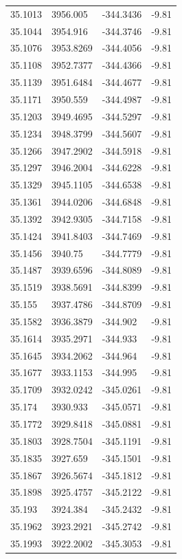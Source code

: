 \begin{table}[H]
\begin{tabular}{llll}
35.1013 & 3956.005 & -344.3436 & -9.81 \\
35.1044 & 3954.916 & -344.3746 & -9.81 \\
35.1076 & 3953.8269 & -344.4056 & -9.81 \\
35.1108 & 3952.7377 & -344.4366 & -9.81 \\
35.1139 & 3951.6484 & -344.4677 & -9.81 \\
35.1171 & 3950.559 & -344.4987 & -9.81 \\
35.1203 & 3949.4695 & -344.5297 & -9.81 \\
35.1234 & 3948.3799 & -344.5607 & -9.81 \\
35.1266 & 3947.2902 & -344.5918 & -9.81 \\
35.1297 & 3946.2004 & -344.6228 & -9.81 \\
35.1329 & 3945.1105 & -344.6538 & -9.81 \\
35.1361 & 3944.0206 & -344.6848 & -9.81 \\
35.1392 & 3942.9305 & -344.7158 & -9.81 \\
35.1424 & 3941.8403 & -344.7469 & -9.81 \\
35.1456 & 3940.75 & -344.7779 & -9.81 \\
35.1487 & 3939.6596 & -344.8089 & -9.81 \\
35.1519 & 3938.5691 & -344.8399 & -9.81 \\
35.155 & 3937.4786 & -344.8709 & -9.81 \\
35.1582 & 3936.3879 & -344.902 & -9.81 \\
35.1614 & 3935.2971 & -344.933 & -9.81 \\
35.1645 & 3934.2062 & -344.964 & -9.81 \\
35.1677 & 3933.1153 & -344.995 & -9.81 \\
35.1709 & 3932.0242 & -345.0261 & -9.81 \\
35.174 & 3930.933 & -345.0571 & -9.81 \\
35.1772 & 3929.8418 & -345.0881 & -9.81 \\
35.1803 & 3928.7504 & -345.1191 & -9.81 \\
35.1835 & 3927.659 & -345.1501 & -9.81 \\
35.1867 & 3926.5674 & -345.1812 & -9.81 \\
35.1898 & 3925.4757 & -345.2122 & -9.81 \\
35.193 & 3924.384 & -345.2432 & -9.81 \\
35.1962 & 3923.2921 & -345.2742 & -9.81 \\
35.1993 & 3922.2002 & -345.3053 & -9.81 \\

\end{tabular}
\end{table}
